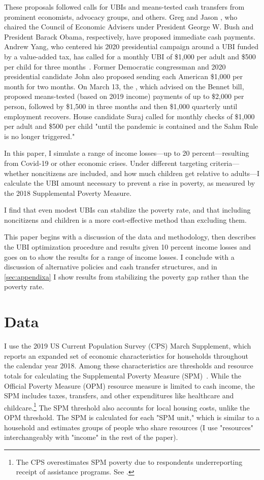 \documentclass[12pt]{article}
\begin{document}
These proposals followed calls for UBIs and means-tested cash transfers from prominent economists, advocacy groups, and others. Greg  and Jason , who chaired the Council of Economic Advisers under President George W. Bush and President Barack Obama, respectively, have proposed immediate cash payments. Andrew Yang, who centered his 2020 presidential campaign around a UBI funded by a value-added tax, has called for a monthly UBI of \$1,000 per adult and \$500 per child for three months~\cite{kroll_2020}.
Former Democratic congressman and 2020 presidential candidate John  also proposed sending each American \$1,000 per month for two months. On March 13, the  , which advised on the Bennet bill, proposed means-tested (based on 2019 income) payments of up to \$2,000 per person, followed by \$1,500 in three months and then \$1,000 quarterly until employment recovers. House candidate Suraj  called for monthly checks of \$1,000 per adult and \$500 per child "until the pandemic is contained and the Sahm Rule is no longer triggered."

In this paper, I simulate a range of income losses---up to 20 percent---resulting from Covid-19 or other economic crises. Under different targeting criteria---whether noncitizens are included, and how much children get relative to adults---I calculate the UBI amount necessary to prevent a rise in poverty, as measured by the 2018 Supplemental Poverty Measure.

I find that even modest UBIs can stabilize the poverty rate, and that including noncitizens and children is a more cost-effective method than excluding them.

This paper begins with a discussion of the data and methodology, then describes the UBI optimization procedure and results given 10 percent income losses and goes on to show the results for a range of income losses. I conclude with a discussion of alternative policies and cash transfer structures, and in \autoref{sec:appendixa} I show results from stabilizing the poverty gap rather than the poverty rate.

\section{Data} \label{sec:data}

I use the 2019 US Current Population Survey (CPS) March Supplement, which reports an expanded set of economic characteristics for households throughout the calendar year 2018. Among these characteristics are thresholds and resource totals for calculating the Supplemental Poverty Measure (SPM)~\cite{spm}. While the Official Poverty Measure (OPM) resource measure is limited to cash income, the SPM includes taxes, transfers, and other expenditures like healthcare and childcare.\footnote{The CPS overestimates SPM poverty due to respondents underreporting receipt of assistance programs. See .} The SPM threshold also accounts for local housing costs, unlike the OPM threshold. The SPM is calculated for each "SPM unit," which is similar to a household and estimates groups of people who share resources (I use "resources" interchangeably with "income" in the rest of the paper).
\end{document}
